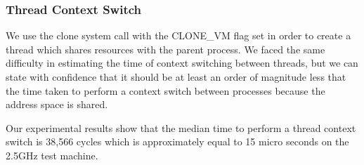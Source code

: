 \subsubsection{Thread Context Switch}
We use the clone system call with the CLONE\_VM flag set in order to create a
thread which shares resources with the parent process. We faced the same
difficulty in estimating the time of context switching between threads, but we
can state with confidence that it should be at least an order of magnitude less
that the time taken to perform a context switch between processes because the
address space is shared.

Our experimental results show that the median time to perform a thread context
switch is 38,566 cycles which is approximately equal to 15 micro seconds on the
2.5GHz test machine.
